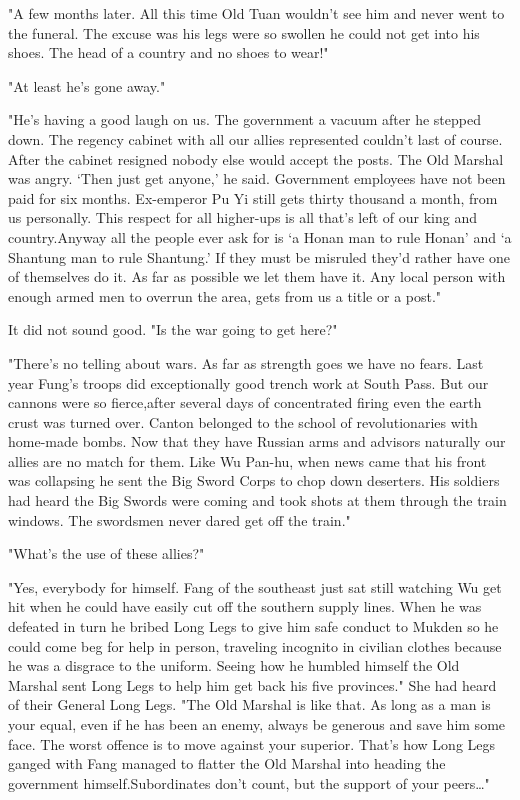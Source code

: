 \par "A few months later. All this time Old Tuan wouldn't see him and never went to the funeral. The excuse was his legs were so swollen he could not get into his shoes. The head of a country and no shoes to wear!"
\par "At least he's gone away."
\par "He's having a good laugh on us. The government a vacuum after he stepped down. The regency cabinet with all our allies represented couldn't last of course. After the cabinet resigned nobody else would accept the posts. The Old Marshal was angry. ‘Then just get anyone,' he said. Government employees have not been paid for six months. Ex-emperor Pu Yi still gets thirty thousand a month, from us personally. This respect for all higher-ups is all that's left of our king and country.Anyway all the people ever ask for is ‘a Honan man to rule Honan' and ‘a Shantung man to rule Shantung.' If they must be misruled they'd rather have one of themselves do it. As far as possible we let them have it. Any local person with enough armed men to overrun the area, gets from us a title or a post."
\par It did not sound good. "Is the war going to get here?"
\par "There's no telling about wars. As far as strength goes we have no fears. Last year Fung's troops did exceptionally good trench work at South Pass. But our cannons were so fierce,after several days of concentrated firing even the earth crust was turned over. Canton belonged to the school of revolutionaries with home-made bombs. Now that they have Russian arms and advisors naturally our allies are no match for them. Like Wu Pan-hu, when news came that his front was collapsing he sent the Big Sword Corps to chop down deserters. His soldiers had heard the Big Swords were coming and took shots at them through the train windows. The swordsmen never dared get off the train."
\par "What's the use of these allies?"
\par "Yes, everybody for himself. Fang of the southeast just sat still watching Wu get hit when he could have easily cut off the southern supply lines. When he was defeated in turn he bribed Long Legs to give him safe conduct to Mukden so he could come beg for help in person, traveling incognito in civilian clothes because he was a disgrace to the uniform. Seeing how he humbled himself the Old Marshal sent Long Legs to help him get back his five provinces." She had heard of their General Long Legs. "The Old Marshal is like that. As long as a man is your equal, even if he has been an enemy, always be generous and save him some face. The worst offence is to move against your superior. That's how Long Legs ganged with Fang managed to flatter the Old Marshal into heading the government himself.Subordinates don't count, but the support of your peers…"
